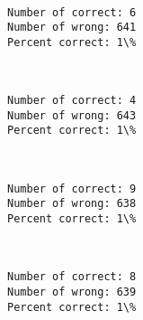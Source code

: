 \documentclass[11pt]{article}
\begin{document}
    \begin{center}
    \end{center}
    { \hspace*{\fill} \\}
    
    \begin{Verbatim}[commandchars=\\\{\}]
Number of correct: 6
Number of wrong: 641
Percent correct: 1\%

    \end{Verbatim}

    \begin{center}
    \end{center}
    { \hspace*{\fill} \\}
    
    \begin{Verbatim}[commandchars=\\\{\}]
Number of correct: 4
Number of wrong: 643
Percent correct: 1\%

    \end{Verbatim}

    \begin{center}
    \end{center}
    { \hspace*{\fill} \\}
    
    \begin{Verbatim}[commandchars=\\\{\}]
Number of correct: 9
Number of wrong: 638
Percent correct: 1\%

    \end{Verbatim}

    \begin{center}
    \end{center}
    { \hspace*{\fill} \\}
    
    \begin{Verbatim}[commandchars=\\\{\}]
Number of correct: 8
Number of wrong: 639
Percent correct: 1\%

    \end{Verbatim}
\end{document}
